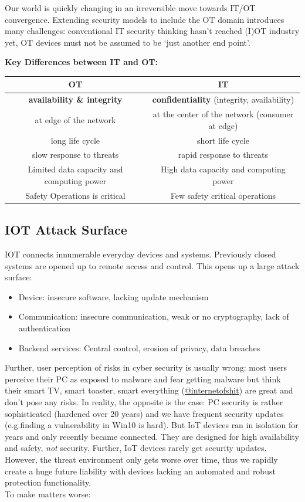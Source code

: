 \documentclass[11pt,oneside,a4paper]{article}
\begin{document}
Our world is quickly changing in an irreversible move towards IT/OT convergence. Extending security models to include the OT domain introduces many challenges: conventional IT security thinking hasn't reached (I)OT industry yet, OT devices must not be assumed to be ‘just another end point’.

\textbf{Key Differences between IT and OT:}

\begin{tabular}{|c|c|}
	\hline 
	OT& IT \\ 
	\hline 
	\textbf{availability \& integrity} & \textbf{confidentiality} (integrity, availability)  \\ 
	at edge of the network & at the center of the network (consumer at edge) \\
	long life cycle & short life cycle \\
	slow response to threats & rapid response to threats \\
	Limited data capacity and computing power & High data capacity and computing power \\
	Safety Operations is critical & Few safety critical operations \\
	\hline 
\end{tabular} 

\subsection{IOT	Attack Surface}

IOT connects innumerable everyday devices and systems. Previously closed systems are opened up to remote access and control. This opens up a large attack surface:

\vspace{-\topsep}
\begin{itemize}
	\setlength{\itemsep}{0pt}
	\setlength{\parskip}{0pt}
	\item Device: insecure software, lacking update mechanism
	\item Communication: insecure communication, weak or no cryptography, lack of authentication
	\item Backend services: Central control, erosion of privacy, data breaches
\end{itemize}
\vspace{-\topsep}

Further, user perception of risks in cyber security is usually wrong: most users perceive their PC as exposed to malware and fear getting malware but think their smart TV, smart toaster, smart everything (\href{https://twitter.com/internetofshit}{@internetofshit}) are great and don't pose any risks. In reality, the opposite is the case: PC security is rather sophisticated (hardened over 20 years) and we have frequent security updates (e.g.finding a vulnerability in Win10 is hard). But IoT devices ran in isolation for years and only recently became connected. They are designed for high availability and safety, \textit{not} security. Further, IoT devices rarely get security updates. However, the threat environment only gets worse over time, thus we rapidly create a huge future liability with devices lacking an automated and robust protection functionality.\\
To make matters worse:
\end{document}
